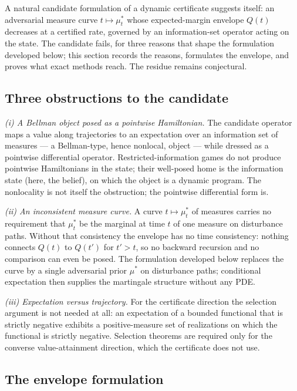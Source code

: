 \documentclass[10pt,twocolumn]{article}
\theoremstyle{plain}
\theoremstyle{definition}
\theoremstyle{remark}
\begin{document}
A natural candidate formulation of a dynamic certificate suggests itself: an adversarial measure curve $t \mapsto \mu^{*}_{t}$ whose expected-margin envelope $Q(t)$ decreases at a certified rate, governed by an information-set operator acting on the state. The candidate fails, for three reasons that shape the formulation developed below; this section records the reasons, formulates the envelope, and proves what exact methods reach. The residue remains conjectural.

\subsection{Three obstructions to the candidate}

\emph{(i) A Bellman object posed as a pointwise Hamiltonian.} The candidate operator maps a
value along trajectories to an expectation over an information set of
measures --- a Bellman-type, hence nonlocal, object --- while dressed as a
pointwise differential operator. Restricted-information games do not
produce pointwise Hamiltonians in the state; their well-posed home is the
information state (here, the belief), on which the object is a dynamic
program. The nonlocality is not itself the obstruction; the pointwise differential form is.

\emph{(ii) An inconsistent measure curve.} A curve $t \mapsto
\mu^{*}_{t}$ of measures carries no requirement that $\mu^{*}_{t}$ be the
marginal at time $t$ of one measure on disturbance paths. Without that
consistency the envelope has no time consistency: nothing connects $Q(t)$
to $Q(t')$ for $t' > t$, so no backward recursion and no comparison can
even be posed. The formulation developed below replaces the curve by a single adversarial prior $\mu^{*}$ on disturbance paths; conditional expectation then supplies
the martingale structure without any PDE.

\emph{(iii) Expectation versus trajectory.} For the certificate direction
the selection argument is not needed at all: an expectation of a bounded
functional that is strictly negative exhibits a positive-measure set of
realizations on which the functional is strictly negative. Selection
theorems are required only for the converse value-attainment direction,
which the certificate does not use.

\subsection{The envelope formulation}
\end{document}
